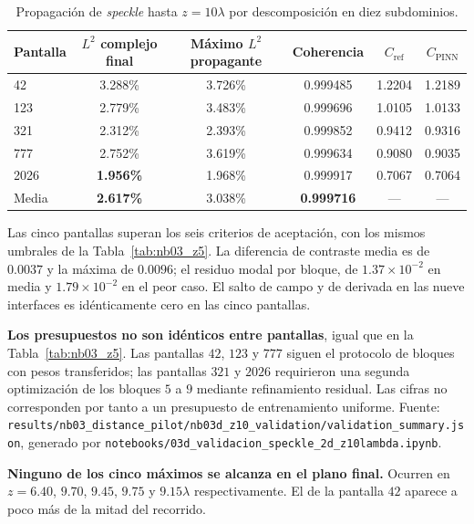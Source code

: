 \begin{table}[htbp]
\centering
\begin{threeparttable}
\caption{Propagación de \textit{speckle} hasta $z=10\lambda$ por descomposición
en diez subdominios.}
\label{tab:nb03_z10}
\begin{tabular}{lccccc}
\toprule
Pantalla & $L^2$ complejo final & Máximo $L^2$ propagante & Coherencia & $C_\text{ref}$ & $C_\text{PINN}$ \\
\midrule
42   & 3.288\% & 3.726\%\tnote{a} & 0.999485 & 1.2204 & 1.2189 \\
123  & 2.779\% & 3.483\%          & 0.999696 & 1.0105 & 1.0133 \\
321  & 2.312\% & 2.393\%          & 0.999852 & 0.9412 & 0.9316 \\
777  & 2.752\% & 3.619\%          & 0.999634 & 0.9080 & 0.9035 \\
2026 & \textbf{1.956\%} & 1.968\% & 0.999917 & 0.7067 & 0.7064 \\
\midrule
Media & \textbf{2.617\%} & 3.038\% & \textbf{0.999716} & --- & --- \\
\bottomrule
\end{tabular}
\begin{tablenotes}\small
    \item Las cinco pantallas superan los seis criterios de aceptación, con los
    mismos umbrales de la Tabla~\ref{tab:nb03_z5}. La diferencia de contraste
    media es de $0.0037$ y la máxima de $0.0096$; el residuo modal por bloque,
    de $1.37\times10^{-2}$ en media y $1.79\times10^{-2}$ en el peor caso. El
    salto de campo y de derivada en las nueve interfaces es idénticamente cero
    en las cinco pantallas.
    \item \textbf{Los presupuestos no son idénticos entre pantallas}, igual que
    en la Tabla~\ref{tab:nb03_z5}. Las pantallas $42$, $123$ y $777$ siguen el
    protocolo de bloques con pesos transferidos; las pantallas $321$ y $2026$
    requirieron una segunda optimización de los bloques $5$ a $9$ mediante
    refinamiento residual. Las cifras no corresponden por tanto a un
    presupuesto de entrenamiento uniforme. Fuente:
    \texttt{results/nb03\_distance\_pilot/nb03d\_z10\_validation/validation\_summary.json},
    generado por
    \texttt{notebooks/03d\_validacion\_speckle\_2d\_z10lambda.ipynb}.
    \item[a] \textbf{Ninguno de los cinco máximos se alcanza en el plano
    final.} Ocurren en $z=6.40$, $9.70$, $9.45$, $9.75$ y $9.15\lambda$
    respectivamente. El de la pantalla $42$ aparece a poco más de la mitad del
    recorrido.
\end{tablenotes}
\end{threeparttable}
\end{table}

